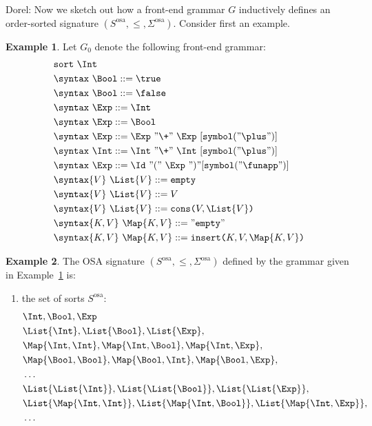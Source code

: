 \documentclass{article}
\newcommand\comment[2]{\par\noindent\color{red}#1: #2\color{black}\par\noindent}
\newcommand\dl{\comment{Dorel}}
\theoremstyle{definition}
\newtheorem{example}{Example}[section]
\theoremstyle{definition}
\theoremstyle{definition}
\theoremstyle{definition}
\theoremstyle{theorem}
\theoremstyle{theorem}
\theoremstyle{theorem}
\theoremstyle{theorem}
\theoremstyle{theorem}
\newcommand{\KWsymbol}{\texttt{symbol}}
\newcommand{\sort}{\texttt{sort}}
\begin{document}
\dl{
Now we sketch out how a front-end grammar $G$ inductively defines an order-sorted signature $(S^\textrm{osa},\le, \Sigma^\textrm{osa})$. Consider first an example.


\begin{example}\label{ex:front-end-grammar}
Let $G_0$ denote the following front-end grammar:
\begin{align*}
&\sort\ \Int\\
&\syntax\ \Bool ::= \true\\
&\syntax\ \Bool ::= \false\\
&\syntax\ \Exp ::= \Int\\
&\syntax\ \Exp ::= \Bool\\
&\syntax\ \Exp ::= \Exp\ "\+"\ \Exp\ [\KWsymbol("\plus")]\\
&\syntax\ \Int ::= \Int\ "\+"\ \Int\ [\KWsymbol("\plus")]\\
&\syntax\ \Exp ::= \Id\ "("\ \Exp\ ")" [\KWsymbol("\funapp")]\\
&\syntax\{V\}\ \List{V} ::= \texttt{empty}\\
&\syntax\{V\}\ \List{V} ::= V\\
&\syntax\{V\}\ \List{V} ::= \texttt{cons(}V,\List{V}\texttt{)}\\
&\syntax\{K,V\}\ \Map{K,V} ::= "\texttt{empty}"\\
&\syntax\{K,V\}\ \Map{K, V} ::= \texttt{insert(}K, V, \Map{K, V}\texttt{)}
\end{align*}
\end{example}
\begin{example}
The OSA signature $(S^\textrm{osa},\le, \Sigma^\textrm{osa})$ defined by the grammar given in Example~\ref{ex:front-end-grammar} is:
\begin{enumerate}
\item the set of sorts $S^\textrm{osa}$:
\begin{align*}
&\Int, \Bool,\Exp\\
&\List{\Int}, \List{\Bool},\List{\Exp},\\
&\Map{\Int,\Int}, \Map{\Int,\Bool}, \Map{\Int,\Exp},\\ 
&\Map{\Bool,\Bool},\Map{\Bool,\Int},  \Map{\Bool,\Exp}, \\
&\ldots\\
&\List{\List{\Int}}, \List{\List{\Bool}},\List{\List{\Exp}},\\
&\List{\Map{\Int,\Int}}, \List{\Map{\Int,\Bool}}, \List{\Map{\Int,\Exp}},\\ 
&\ldots\\

\end{align*}
\end{enumerate}
\end{example}}
\end{document}
